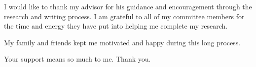 %
%
%
%
%

\begin{statement}
\end{statement}


\begin{acknowledgments}
  I would like to thank my advisor for his guidance and encouragement through the research and writing process. I am grateful to all of my committee members for the time and energy they have put into helping me complete my research. 
	
	\bigskip
	My family and friends kept me motivated and happy during this long process.
	
	\bigskip
	Your support means so much to me. Thank you.
\end{acknowledgments}

